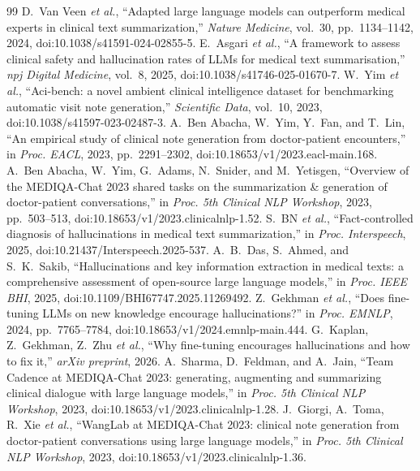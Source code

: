 \documentclass[conference]{IEEEtran}
\begin{document}
\begin{thebibliography}{99}
 D.~Van Veen \emph{et al.}, ``Adapted large language models can outperform medical experts in clinical text summarization,'' \emph{Nature Medicine}, vol.~30, pp.~1134--1142, 2024, doi:10.1038/s41591-024-02855-5.
 E.~Asgari \emph{et al.}, ``A framework to assess clinical safety and hallucination rates of LLMs for medical text summarisation,'' \emph{npj Digital Medicine}, vol.~8, 2025, doi:10.1038/s41746-025-01670-7.
 W.~Yim \emph{et al.}, ``Aci-bench: a novel ambient clinical intelligence dataset for benchmarking automatic visit note generation,'' \emph{Scientific Data}, vol.~10, 2023, doi:10.1038/s41597-023-02487-3.
 A.~Ben Abacha, W.~Yim, Y.~Fan, and T.~Lin, ``An empirical study of clinical note generation from doctor-patient encounters,'' in \emph{Proc. EACL}, 2023, pp.~2291--2302, doi:10.18653/v1/2023.eacl-main.168.
 A.~Ben Abacha, W.~Yim, G.~Adams, N.~Snider, and M.~Yetisgen, ``Overview of the MEDIQA-Chat 2023 shared tasks on the summarization \& generation of doctor-patient conversations,'' in \emph{Proc. 5th Clinical NLP Workshop}, 2023, pp.~503--513, doi:10.18653/v1/2023.clinicalnlp-1.52.
 S.~BN \emph{et al.}, ``Fact-controlled diagnosis of hallucinations in medical text summarization,'' in \emph{Proc. Interspeech}, 2025, doi:10.21437/Interspeech.2025-537.
 A.~B.~Das, S.~Ahmed, and S.~K.~Sakib, ``Hallucinations and key information extraction in medical texts: a comprehensive assessment of open-source large language models,'' in \emph{Proc. IEEE BHI}, 2025, doi:10.1109/BHI67747.2025.11269492.
 Z.~Gekhman \emph{et al.}, ``Does fine-tuning LLMs on new knowledge encourage hallucinations?'' in \emph{Proc. EMNLP}, 2024, pp.~7765--7784, doi:10.18653/v1/2024.emnlp-main.444.
 G.~Kaplan, Z.~Gekhman, Z.~Zhu \emph{et al.}, ``Why fine-tuning encourages hallucinations and how to fix it,'' \emph{arXiv preprint}, 2026.
 A.~Sharma, D.~Feldman, and A.~Jain, ``Team Cadence at MEDIQA-Chat 2023: generating, augmenting and summarizing clinical dialogue with large language models,'' in \emph{Proc. 5th Clinical NLP Workshop}, 2023, doi:10.18653/v1/2023.clinicalnlp-1.28.
 J.~Giorgi, A.~Toma, R.~Xie \emph{et al.}, ``WangLab at MEDIQA-Chat 2023: clinical note generation from doctor-patient conversations using large language models,'' in \emph{Proc. 5th Clinical NLP Workshop}, 2023, doi:10.18653/v1/2023.clinicalnlp-1.36.

\end{thebibliography}
\end{document}
